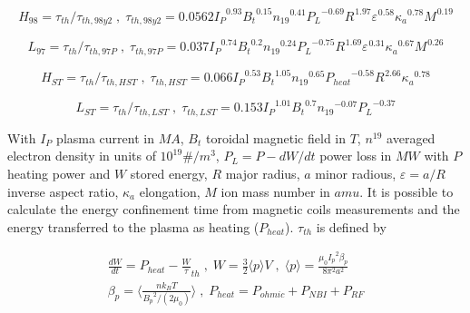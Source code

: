 \begin{equation}
{ H }_{ 98 }={\tau }_{ th }/{\tau }_{ th,98y2 } \; , \; {\tau }_{ th,98y2 }=0.0562 {{ I }_{ P }}^{ 0.93} {{ B }_{ t }}^{ 0.15} {{ n }_{ 19 }}^{ 0.41} {{ P }_{ L }}^{ -0.69} {{ R }_{  }}^{ 1.97} {{ \varepsilon  }_{  }}^{ 0.58} {{ \kappa  }_{ a }}^{ 0.78} {{ M }_{  }}^{ 0.19}
\label{eq:h98y2}
\end{equation}

\begin{equation}
{ L }_{ 97 }={\tau }_{ th }/{\tau }_{ th,97P } \; , \; {\tau }_{ th,97P }=0.037 {{ I }_{ P }}^{ 0.74} {{ B }_{ t }}^{ 0.2} {{ n }_{ 19 }}^{ 0.24} {{ P }_{ L }}^{ -0.75} {{ R }_{  }}^{ 1.69} {{ \varepsilon  }_{  }}^{ 0.31} {{ \kappa  }_{ a }}^{ 0.67} {{ M }_{  }}^{ 0.26}
\label{eq:l97}
\end{equation}


\begin{equation}
{ H }_{ ST }={\tau }_{ th }/{\tau }_{ th,HST } \; , \; {\tau }_{ th,HST }=0.066 {{ I }_{ P }}^{ 0.53} {{ B }_{ t }}^{ 1.05} {{ n }_{ 19 }}^{ 0.65} {{ P }_{ heat }}^{ -0.58} {{ R }_{  }}^{ 2.66} {{ \kappa  }_{ a }}^{ 0.78}
\label{eq:HST}
\end{equation}

\begin{equation}
{ L }_{ ST }={\tau }_{ th }/{\tau }_{ th,LST } \; , \; {\tau }_{ th,LST }=0.153 {{ I }_{ P }}^{ 1.01} {{ B }_{ t }}^{ 0.7} {{ n }_{ 19 }}^{ -0.07} {{ P }_{ L }}^{ -0.37}
\label{eq:LST}
\end{equation}

With $I_P$ plasma current in $MA$, $B_t$ toroidal magnetic field in $T$, $n^{19}$ averaged electron density in units of $10^{19} \#/m^3$, $P_L=P-dW/dt$ power loss in $MW$ with $P$ heating power and $W$ stored energy, $R$ major radius, $a$ minor radious, $\varepsilon=a/R$ inverse aspect ratio, $\kappa _a$ elongation, $M$ ion mass number in $amu$.
It is possible to calculate the energy confinement time from magnetic coils measurements and the energy transferred to the plasma as heating ($P_{heat}$). $\tau_{th}$ is defined by 

\begin{equation}
\begin{split}
\frac {dW} {dt}={P}_{heat} - \frac {W} {\tau }_{ th } \; , \; W=\frac { 3} {2} \langle p \rangle V \; , \; \langle p \rangle = \frac {{ \mu }_{ 0 } {{ I }_{ p }}^{ 2 } { \beta }_{ p }} { 8 {\pi}^{2} {a}^{2}  } \\ {\beta }_{ p } = \langle \frac { n {k}_{B} T} { {{B}_{p}}^{2} /(2 {\mu}_{0}) } \rangle \; , \; {P }_{ heat }={ P }_{ ohmic }+{ P }_{ NBI }+{ P }_{ RF }
\label{eq:tau}
\end{split}
\end{equation}


